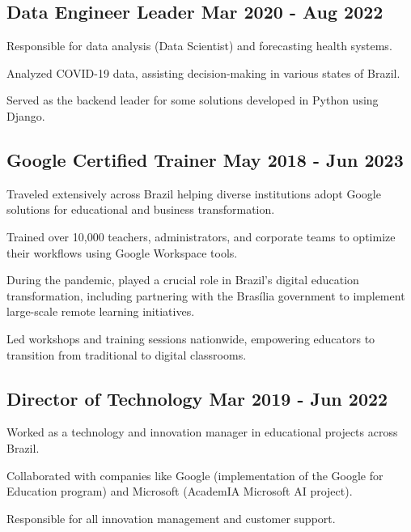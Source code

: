 \documentclass[letter,10pt]{article}
\begin{document}
\subsection{{Data Engineer Leader \hfill Mar 2020 - Aug 2022}}
\begin{zitemize}
\item Responsible for data analysis (Data Scientist) and forecasting health systems.
\item Analyzed COVID-19 data, assisting decision-making in various states of Brazil.
\item Served as the backend leader for some solutions developed in Python using Django.
\end{zitemize}


\subsection{{Google Certified Trainer \hfill May 2018 - Jun 2023}}
\begin{zitemize}
\item Traveled extensively across Brazil helping diverse institutions adopt Google solutions for educational and business transformation.
\item Trained over 10,000 teachers, administrators, and corporate teams to optimize their workflows using Google Workspace tools.
\item During the pandemic, played a crucial role in Brazil's digital education transformation, including partnering with the Brasília government to implement large-scale remote learning initiatives.
\item Led workshops and training sessions nationwide, empowering educators to transition from traditional to digital classrooms.
\end{zitemize}

\newpage

\subsection{{Director of Technology \hfill Mar 2019 - Jun 2022}}
\begin{zitemize}
\item Worked as a technology and innovation manager in educational projects across Brazil.
\item Collaborated with companies like Google (implementation of the Google for Education program) and Microsoft (AcademIA Microsoft AI project).
\item Responsible for all innovation management and customer support.
\end{zitemize}
\end{document}
